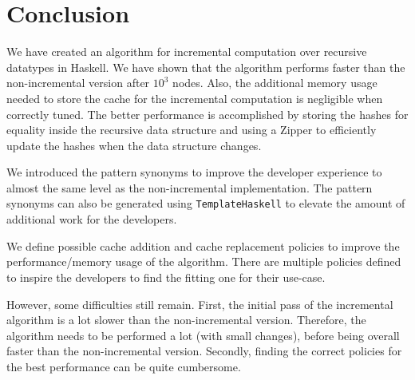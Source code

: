 \chapter{Conclusion}

We have created an algorithm for incremental computation over recursive datatypes in Haskell. We have shown that the algorithm performs faster than the non-incremental version after $10^3$ nodes. Also, the additional memory usage needed to store the cache for the incremental computation is negligible when correctly tuned. The better performance is accomplished by storing the hashes for equality inside the recursive data structure and using a Zipper to efficiently update the hashes when the data structure changes.

We introduced the pattern synonyms to improve the developer experience to almost the same level as the non-incremental implementation. The pattern synonyms can also be generated using \texttt{TemplateHaskell} to elevate the amount of additional work for the developers.

We define possible cache addition and cache replacement policies to improve the performance/memory usage of the algorithm. There are multiple policies defined to inspire the developers to find the fitting one for their use-case.

However, some difficulties still remain. First, the initial pass of the incremental algorithm is a lot slower than the non-incremental version. Therefore, the algorithm needs to be performed a lot (with small changes), before being overall faster than the non-incremental version. Secondly, finding the correct policies for the best performance can be quite cumbersome. 

